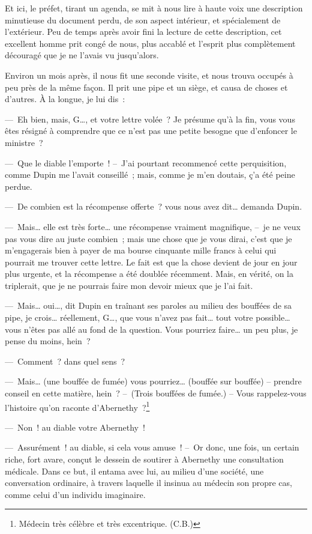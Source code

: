\documentclass[french,twoside]{book} %
\begin{document}
Et ici, le préfet, tirant un agenda, se mit à nous lire à haute voix une description minutieuse du document perdu, de son aspect intérieur, et spécialement de l’extérieur. Peu de temps après avoir fini la lecture de cette description, cet excellent homme prit congé de nous, plus accablé et l’esprit plus complètement découragé que je ne l’avais vu jusqu’alors.\par
Environ un mois après, il nous fit une seconde visite, et nous trouva occupés à peu près de la même façon. Il prit une pipe et un siège, et causa de choses et d’autres. À la longue, je lui dis :\par
— Eh bien, mais, G…, et votre lettre volée ? Je présume qu’à la fin, vous vous êtes résigné à comprendre que ce n’est pas une petite besogne que d’enfoncer le ministre ?\par
— Que le diable l’emporte ! – J’ai pourtant recommencé cette perquisition, comme Dupin me l’avait conseillé ; mais, comme je m’en doutais, ç’a été peine perdue.\par
— De combien est la récompense offerte ? vous nous avez dit… demanda Dupin.\par
— Mais… elle est très forte… une récompense vraiment magnifique, – je ne veux pas vous dire au juste combien ; mais une chose que je vous dirai, c’est que je m’engagerais bien à payer de ma bourse cinquante mille francs à celui qui pourrait me trouver cette lettre. Le fait est que la chose devient de jour en jour plus urgente, et la récompense a été doublée récemment. Mais, en vérité, on la triplerait, que je ne pourrais faire mon devoir mieux que je l’ai fait.\par
— Mais… oui…, dit Dupin en traînant ses paroles au milieu des bouffées de sa pipe, je crois… réellement, G…, que vous n’avez pas fait… tout votre possible… vous n’êtes pas allé au fond de la question. Vous pourriez faire… un peu plus, je pense du moins, hein ?\par
— Comment ? dans quel sens ?\par
— Mais… (une bouffée de fumée) vous pourriez… (bouffée sur bouffée) – prendre conseil en cette matière, hein ? – (Trois bouffées de fumée.) – Vous rappelez-vous l’histoire qu’on raconte d’Abernethy ?\footnote{Médecin très célèbre et très excentrique. (C.B.)}\par
— Non ! au diable votre Abernethy !\par
— Assurément ! au diable, si cela vous amuse ! – Or donc, une fois, un certain riche, fort avare, conçut le dessein de soutirer à Abernethy une consultation médicale. Dans ce but, il entama avec lui, au milieu d’une société, une conversation ordinaire, à travers laquelle il insinua au médecin son propre cas, comme celui d’un individu imaginaire.\par
\end{document}
